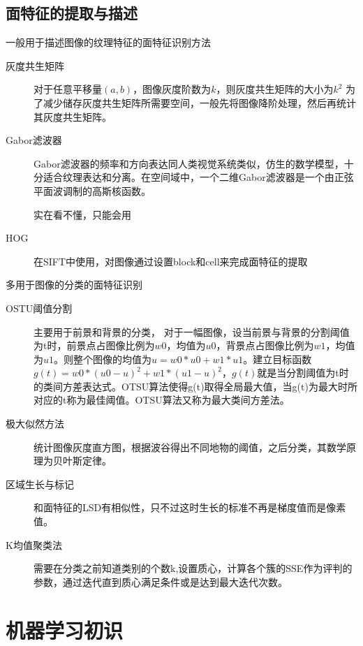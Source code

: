 \documentclass[a4paper,16pt,UTF8]{article}
\begin{document}
\subsection{\Large 面特征的提取与描述}

一般用于描述图像的纹理特征的面特征识别方法
\begin{description}
    \item[灰度共生矩阵]
    对于任意平移量$(a,b)$，图像灰度阶数为$k$，则灰度共生矩阵的大小为$k^{2}$
    为了减少储存灰度共生矩阵所需要空间，一般先将图像降阶处理，然后再统计其灰度共生矩阵。

    \item[Gabor滤波器]

    Gabor滤波器的频率和方向表达同人类视觉系统类似，仿生的数学模型，十分适合纹理表达和分离。在空间域中，一个二维Gabor滤波器是一个由正弦平面波调制的高斯核函数。

    实在看不懂，只能会用

    \item[HOG]
    在SIFT中使用，对图像通过设置block和cell来完成面特征的提取

\end{description}

多用于图像的分类的面特征识别
\begin{description}
    \item[OSTU阈值分割]
    主要用于前景和背景的分类， 对于一幅图像，设当前景与背景的分割阈值为t时，前景点占图像比例为$w0$，均值为$u0$，背景点占图像比例为$w1$，均值为$u1$。则整个图像的均值为$u = w0*u0+w1*u1$。建立目标函数$g(t)=w0*(u0-u)^2+w1*(u1-u)^2$，$g(t)$就是当分割阈值为t时的类间方差表达式。OTSU算法使得g(t)取得全局最大值，当g(t)为最大时所对应的t称为最佳阈值。OTSU算法又称为最大类间方差法。
    \item[极大似然方法]
    统计图像灰度直方图，根据波谷得出不同地物的阈值，之后分类，其数学原理为贝叶斯定律。
    \item[区域生长与标记]
    和面特征的LSD有相似性，只不过这时生长的标准不再是梯度值而是像素值。
    \item[K均值聚类法]
    需要在分类之前知道类别的个数k,设置质心，计算各个簇的SSE作为评判的参数，通过迭代直到质心满足条件或是达到最大迭代次数。

\end{description}

\section{\LARGE 机器学习初识}
\end{document}
